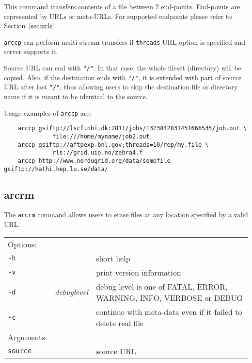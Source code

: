 This command transfers contents of a file between 2 end-points.
End-points are represented by URLs or meta-URLs. For supported
endpoints please refer to Section~\ref{sec:urls}.

\texttt{arccp} can perform multi-stream transfers if \texttt{threads}
URL option is specified and server supports it.

Source URL can end with \verb#"/"#. In that case, the whole fileset
(directory) will be copied. Also, if the destination ends with
\verb#"/"#, it is extended with part of source URL after last
\verb#"/"#, thus allowing users to skip the destination file or
directory name if it is meant to be identical to the source.

Usage examples of \texttt{arccp} are:

\begin{verbatim}
    arccp gsiftp://lscf.nbi.dk:2811/jobs/1323842831451666535/job.out \
              file:///home/myname/job2.out
    arccp gsiftp://aftpexp.bnl.gov;threads=10/rep/my.file \
              rls://grid.uio.no/zebra4.f
    arccp http://www.nordugrid.org/data/somefile gsiftp://hathi.hep.lu.se/data/
\end{verbatim}

\subsection{arcrm}\label{sec:arcrm}

The \texttt{arcrm}
command allows users to erase files at any location specified by a
valid URL.
\hspace*{0.5cm}
\begin{shaded}
\end{shaded}
\begin{longtable}{llp{8cm}}
    Options:&&\\
    \texttt{-h} && short help\\
    \texttt{-v} && print version information\\
    \texttt{-d} & \textit{debuglevel} &debug level is one of  FATAL, ERROR, WARNING, INFO, VERBOSE or DEBUG\\
    \texttt{-c} & &continue with meta-data even if it failed to delete real file\\
    Arguments:&&\\
    \texttt{source} && source URL\\
\end{longtable}

